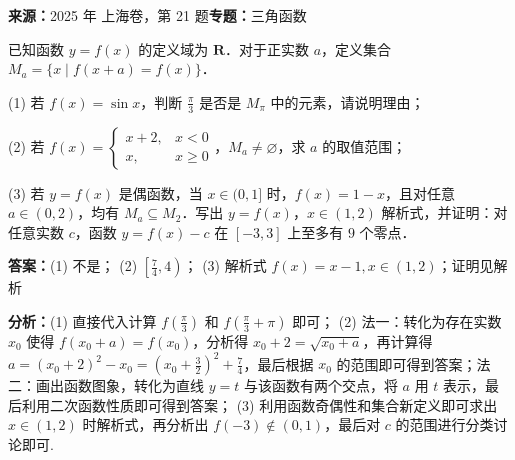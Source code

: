 \begin{question}[points=18]
\textbf{来源：}2025 年 上海卷，第 21 题\quad \textbf{专题：}三角函数\par
已知函数 $y = f(x)$ 的定义域为 $\mathbf{R}$．对于正实数 $a$，定义集合 $M_a = \{x \mid f(x+a) = f(x)\}$．

(1) 若 $f(x) = \sin x$，判断 $\frac{\pi}{3}$ 是否是 $M_\pi$ 中的元素，请说明理由；

(2) 若 $f(x) = \begin{cases} x+2, & x < 0 \\ x, & x \geq 0 \end{cases}$，$M_a \neq \varnothing$，求 $a$ 的取值范围；

(3) 若 $y = f(x)$ 是偶函数，当 $x \in (0,1]$ 时，$f(x) = 1 - x$，且对任意 $a \in (0,2)$，均有 $M_a \subseteq M_2$．写出 $y = f(x)$，$x \in (1,2)$ 解析式，并证明：对任意实数 $c$，函数 $y = f(x) - c$ 在 $[-3,3]$ 上至多有 $9$ 个零点．
\begin{solution}
\textbf{答案：}(1) 不是； (2) $\left[\frac{7}{4}, 4\right)$； (3) 解析式 $f(x) = x - 1, x \in (1,2)$；证明见解析

\textbf{分析：}(1) 直接代入计算 $f\left(\frac{\pi}{3}\right)$ 和 $f\left(\frac{\pi}{3} + \pi\right)$ 即可； (2) 法一：转化为存在实数 $x_0$ 使得 $f(x_0 + a) = f(x_0)$，分析得 $x_0 + 2 = \sqrt{x_0 + a}$，再计算得 $a = (x_0 + 2)^2 - x_0 = \left(x_0 + \frac{3}{2}\right)^2 + \frac{7}{4}$，最后根据 $x_0$ 的范围即可得到答案；法二：画出函数图象，转化为直线 $y = t$ 与该函数有两个交点，将 $a$ 用 $t$ 表示，最后利用二次函数性质即可得到答案； (3) 利用函数奇偶性和集合新定义即可求出 $x \in (1,2)$ 时解析式，再分析出 $f(-3) \notin (0,1)$，最后对 $c$ 的范围进行分类讨论即可.


\end{solution}
\end{question}
